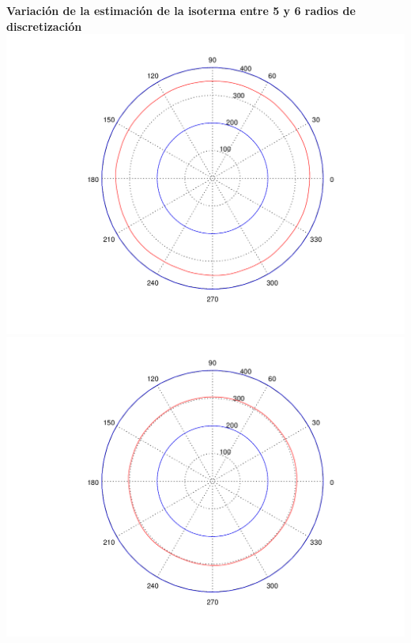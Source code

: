 \begin{enumerate}
  	\textbf{Variación de la estimación de la isoterma entre 5 y 6 radios de discretización}\\
	\includegraphics[scale=0.35]{experimentos1a_1b/evolucion_posicion_isoterma_temperatura/test2/test6_006_radios_inst_001_isomap.png}
	\includegraphics[scale=0.35]{experimentos1a_1b/evolucion_posicion_isoterma_temperatura/test2/test6_007_radios_inst_001_isomap.png}
	

\end{enumerate}
